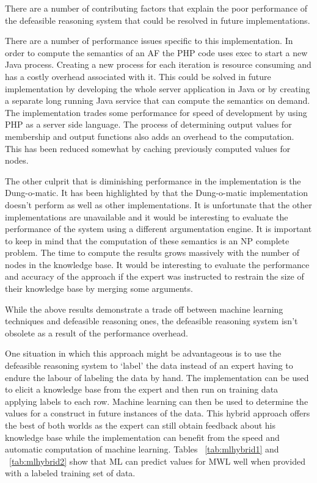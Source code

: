 There are a number of contributing factors that explain the poor performance of the defeasible reasoning system that could be resolved in future implementations. 

There are a number of performance issues specific to this implementation. In order to compute the semantics of an AF the PHP code uses exec to start a new Java process. Creating a new process for each iteration is resource consuming and has a costly overhead associated with it. This could be solved in future implementation by developing the whole server application in Java or by creating a separate long running Java service that can compute the semantics on demand. The implementation trades some performance for speed of development by using PHP as a server side language. The process of determining output values for membership and output functions also adds an overhead to the computation. This has been reduced somewhat by caching previously computed values for nodes. 

The other culprit that is diminishing performance in the implementation is the Dung-o-matic. It has been highlighted by \cite{cerutti2014generating} that the Dung-o-matic implementation doesn't perform as well as other implementations. It is unfortunate that the other implementations are unavailable and it would be interesting to evaluate the performance of the system using a different argumentation engine. It is important to keep in mind that the computation of these semantics is an NP complete problem. The time to compute the results grows massively with the number of nodes in the knowledge base. It would be interesting to evaluate the performance and accuracy of the approach if the expert was instructed to restrain the size of their knowledge base by merging some arguments.

While the above results demonstrate a trade off between machine learning techniques and defeasible reasoning ones, the defeasible reasoning system isn't obsolete as a result of the performance overhead. 

One situation in which this approach might be advantageous is to use the defeasible reasoning system to `label' the data instead of an expert having to endure the labour of labeling the data by hand. The implementation can be used to elicit a knowledge base from the expert and then run on training data applying labels to each row. Machine learning can then be used to determine the values for a construct in future instances of the data. This hybrid approach offers the best of both worlds as the expert can still obtain feedback about his knowledge base while the implementation can benefit from the speed and automatic computation of machine learning. Tables ~\ref{tab:mlhybrid1} and ~\ref{tab:mlhybrid2} show that ML can predict values for MWL well when provided with a labeled training set of data.

